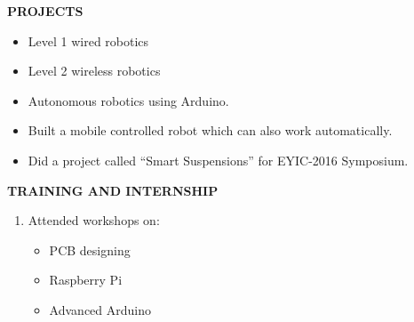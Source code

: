 \documentclass[a4paper]{article}
\begin{document}
\begin{flushleft}
\textbf {PROJECTS}\\
\begin{itemize}
\item	Level 1 wired robotics
\item	Level 2 wireless robotics
\item	Autonomous robotics using Arduino.
\item	Built a  mobile controlled robot which can also work automatically.
\item	Did a project called “Smart Suspensions” for EYIC-2016 Symposium.  
\end{itemize}
\end{flushleft}


\begin{flushleft}
\vspace{2in}
\textbf {TRAINING AND INTERNSHIP}\\
\begin{enumerate}
\item  	Attended workshops on:
\begin{itemize}
 \item PCB designing 
\item  Raspberry Pi
\item Advanced Arduino
\end{itemize}
\end{enumerate}
\end{flushleft}
\end{document}
